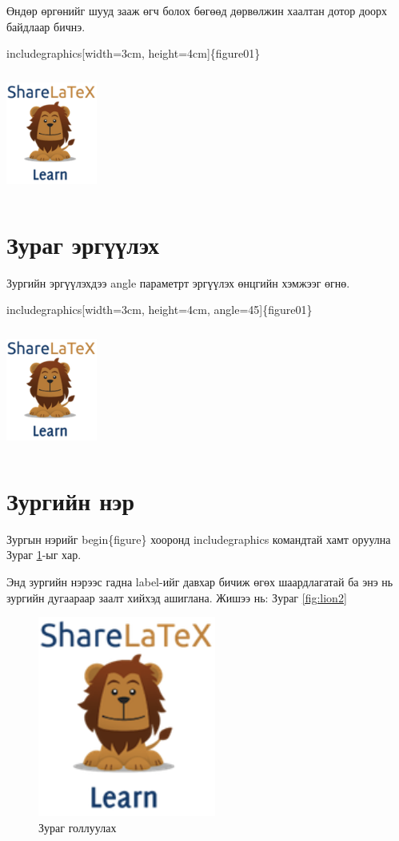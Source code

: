 \documentclass[12pt,A4]{report}
\begin{document}
Өндөр өргөнийг шууд зааж өгч болох бөгөөд дөрвөлжин хаалтан дотор доорх байдлаар бичнэ.
\begin{center}
	includegraphics[width=3cm, height=4cm]\{figure01\}
\end{center}
\includegraphics[width=3cm, height=4cm]{figure01}

\section{Зураг эргүүлэх}
Зургийн эргүүлэхдээ angle параметрт эргүүлэх өнцгийн хэмжээг өгнө.
\begin{center}
	includegraphics[width=3cm, height=4cm, angle=45]\{figure01\}
\end{center}
\includegraphics[width=3cm, height=4cm, angle=45]{figure01}

\section{Зургийн нэр}
Зургын нэрийг begin\{figure\} хооронд includegraphics командтай хамт оруулна Зураг \ref{fig:lion1}-ыг хар.

Энд зургийн нэрээс гадна label-ийг давхар бичиж өгөх шаардлагатай ба энэ нь зургийн дугаараар заалт хийхэд ашиглана. Жишээ нь: Зураг \ref{fig:lion2}

\begin{figure}[h]
	\centering
	\includegraphics[scale=0.9]{figure01}
	\caption{Зураг голлуулах}
	\label{fig:lion1}
\end{figure}
\end{document}
